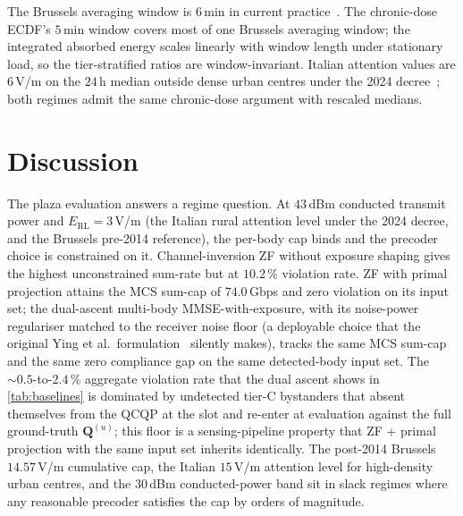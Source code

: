 \documentclass[journal,twocolumn,10pt]{IEEEtran}
\theoremstyle{plain}
\theoremstyle{remark}
\newcommand{\Qmat}{\mathbf{Q}}
\begin{document}
The Brussels averaging window is $6\,$min in current
practice~\cite{BrusselsArrete2024}. The chronic-dose ECDF's
$5\,$min window covers most of one Brussels averaging window;
the integrated absorbed energy scales linearly with window length
under stationary load, so the tier-stratified ratios are
window-invariant. Italian attention values are $6\,$V/m on the
$24\,$h median outside dense urban centres under the 2024
decree~\cite{ItalyDL}; both regimes admit the same chronic-dose
argument with rescaled medians.


\section{Discussion}\label{sec:discussion}

The plaza evaluation answers a regime question. At $43\,$dBm
conducted transmit power and $E_{\mathrm{RL}} = 3\,$V/m (the
Italian rural attention level under the 2024 decree, and the
Brussels pre-2014 reference), the per-body cap binds and the
precoder choice is constrained on it. Channel-inversion ZF
without exposure shaping gives the highest unconstrained sum-rate
but at $10.2\,\%$ violation rate. ZF with primal projection
attains the MCS sum-cap of $74.0\,$Gbps and zero violation on its
input set; the dual-ascent multi-body MMSE-with-exposure, with
its noise-power regulariser matched to the receiver noise floor
(a deployable choice that the original Ying et
al.~formulation~\cite{Ying2017} silently makes), tracks the same
MCS sum-cap and the same zero compliance gap on the same
detected-body input set. The $\sim 0.5$-to-$2.4\,\%$ aggregate
violation rate that the dual ascent shows in \cref{tab:baselines}
is dominated by undetected tier-C bystanders that absent
themselves from the QCQP at the slot and re-enter at evaluation
against the full ground-truth $\Qmat^{(u)}$; this floor is a
sensing-pipeline property that ZF + primal projection with the
same input set inherits identically.
The post-2014 Brussels $14.57\,$V/m cumulative cap, the Italian
$15\,$V/m attention level for high-density urban centres, and the
$30\,$dBm conducted-power band sit in slack regimes where any
reasonable precoder satisfies the cap by orders of magnitude.
\end{document}
